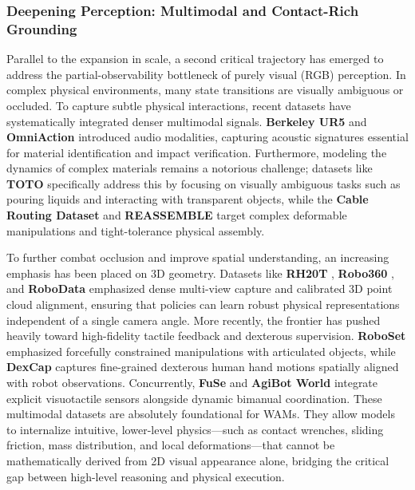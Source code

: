 \subsubsection{Deepening Perception: Multimodal and Contact-Rich Grounding} 
Parallel to the expansion in scale, a second critical trajectory has emerged to address the partial-observability bottleneck of purely visual (RGB) perception. In complex physical environments, many state transitions are visually ambiguous or occluded. To capture subtle physical interactions, recent datasets have systematically integrated denser multimodal signals. \textbf{Berkeley UR5} \cite{BerkeleyUR5Website} and \textbf{OmniAction} \cite{OmniAction} introduced audio modalities, capturing acoustic signatures essential for material identification and impact verification. Furthermore, modeling the dynamics of complex materials remains a notorious challenge; datasets like \textbf{TOTO} \cite{TOTO} specifically address this by focusing on visually ambiguous tasks such as pouring liquids and interacting with transparent objects, while the \textbf{Cable Routing Dataset} \cite{Cable-Routing-Dataset} and \textbf{REASSEMBLE} \cite{REASSEMBLE} target complex deformable manipulations and tight-tolerance physical assembly.

To further combat occlusion and improve spatial understanding, an increasing emphasis has been placed on 3D geometry. Datasets like \textbf{RH20T} \cite{RH20T}, \textbf{Robo360} \cite{Robo360}, and \textbf{RoboData} \cite{RoboData} emphasized dense multi-view capture and calibrated 3D point cloud alignment, ensuring that policies can learn robust physical representations independent of a single camera angle.
More recently, the frontier has pushed heavily toward high-fidelity tactile feedback and dexterous supervision. \textbf{RoboSet} \cite{RoboSet} emphasized forcefully constrained manipulations with articulated objects, while \textbf{DexCap} \cite{DexCap} captures fine-grained dexterous human hand motions spatially aligned with robot observations. Concurrently, \textbf{FuSe} \cite{FuSe} and \textbf{AgiBot World} \cite{AgiBot_World_Colosseo} integrate explicit visuotactile sensors alongside dynamic bimanual coordination. These multimodal datasets are absolutely foundational for WAMs. They allow models to internalize intuitive, lower-level physics—such as contact wrenches, sliding friction, mass distribution, and local deformations—that cannot be mathematically derived from 2D visual appearance alone, bridging the critical gap between high-level reasoning and physical execution.



